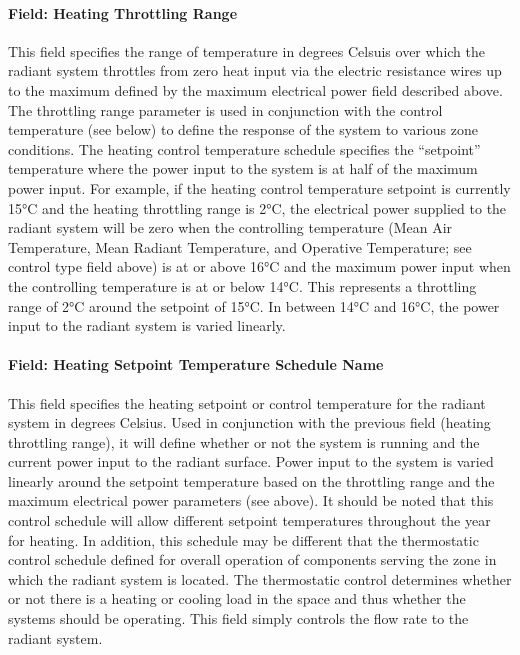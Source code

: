 \paragraph{Field: Heating Throttling Range}\label{field-heating-throttling-range-1}

This field specifies the range of temperature in degrees Celsuis over which the radiant system throttles from zero heat input via the electric resistance wires up to the maximum defined by the maximum electrical power field described above. The throttling range parameter is used in conjunction with the control temperature (see below) to define the response of the system to various zone conditions. The heating control temperature schedule specifies the ``setpoint'' temperature where the power input to the system is at half of the maximum power input. For example, if the heating control temperature setpoint is currently 15°C and the heating throttling range is 2°C, the electrical power supplied to the radiant system will be zero when the controlling temperature (Mean Air Temperature, Mean Radiant Temperature, and Operative Temperature; see control type field above) is at or above 16°C and the maximum power input when the controlling temperature is at or below 14°C. This represents a throttling range of 2°C around the setpoint of 15°C. In between 14°C and 16°C, the power input to the radiant system is varied linearly.

\paragraph{Field: Heating Setpoint Temperature Schedule Name}\label{field-heating-setpoint-temperature-schedule-name-1}

This field specifies the heating setpoint or control temperature for the radiant system in degrees Celsius. Used in conjunction with the previous field (heating throttling range), it will define whether or not the system is running and the current power input to the radiant surface. Power input to the system is varied linearly around the setpoint temperature based on the throttling range and the maximum electrical power parameters (see above). It should be noted that this control schedule will allow different setpoint temperatures throughout the year for heating. In addition, this schedule may be different that the thermostatic control schedule defined for overall operation of components serving the zone in which the radiant system is located. The thermostatic control determines whether or not there is a heating or cooling load in the space and thus whether the systems should be operating. This field simply controls the flow rate to the radiant system.

